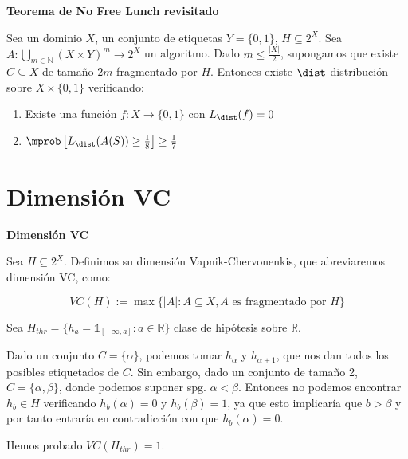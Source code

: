 \begin{theorem}
\textbf{Teorema de No Free Lunch revisitado}

Sea un dominio $X$, un conjunto de etiquetas $Y=\{0,1\}$, $H \subseteq 2^X$.
Sea $A: \underset{m\in \mathbb{N}}{\bigcup} (X\times Y)^m \rightarrow 2^X$ un algoritmo. Dado $m \le \frac{|X|}{2}$,
supongamos que existe $C\subseteq X$ de tamaño $2m$ fragmentado por $H$. Entonces existe $\dist$ distribución sobre 
$X\times \{0,1\}$ verificando:

\begin{enumerate}[i]
\item Existe una función $f: X \rightarrow \{0,1\}$ con $L_{\dist}(f)=0$
\item $\mprob \left[ L_{\dist}(A(S)) \ge \frac{1}{8} \right] \ge \frac{1}{7}$
\end{enumerate}

\label{th:nfl2}
\end{theorem}


\section{Dimensión VC}

\begin{definition}
\textbf{Dimensión VC}

Sea $H \subseteq 2^X$. Definimos su dimensión Vapnik-Chervonenkis, que abreviaremos dimensión VC, como:

\[VC(H) := \max \{|A| : A\subseteq X, A \textrm{ es fragmentado por } H\}\]
\end{definition}


\begin{example}

Sea $H_{thr} = \{h_a = \mathds{1}_{[-\infty, a]}: a\in \mathbb{R}\}$ clase de hipótesis sobre $\mathbb{R}$. 

Dado un conjunto $C=\{\alpha\}$, podemos tomar $h_{\alpha}$ y $h_{\alpha+1}$, que nos dan todos los posibles etiquetados de
$C$. Sin embargo, dado un conjunto de tamaño 2, $C=\{\alpha, \beta\}$, donde podemos suponer spg. $\alpha < \beta$. 
Entonces no podemos encontrar $h_b \in H$ verificando $h_b(\alpha)=0$ y $h_b(\beta) = 1$, ya que esto implicaría que 
$b > \beta$ y por tanto entraría en contradicción con que $h_b(\alpha) = 0$.

Hemos probado $VC(H_{thr}) = 1$.

\end{example}

